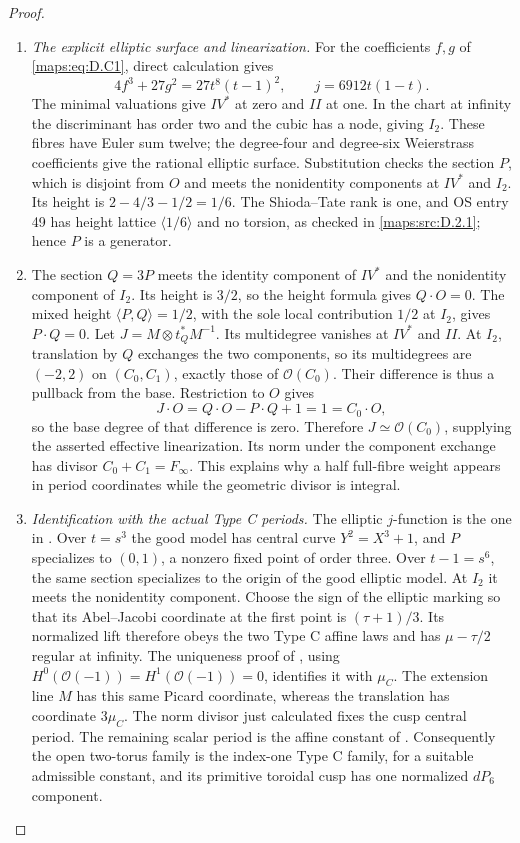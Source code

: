 \begin{proof}
\begin{enumerate}[label=\arabic*.,leftmargin=*]
\item \emph{The explicit elliptic surface and linearization.}
For the coefficients $f,g$ of \eqref{maps:eq:D.C1}, direct calculation gives
\[
 4f^3+27g^2=27t^8(t-1)^2,\qquad
 j=6912t(1-t).
\]
The minimal valuations give $IV^*$ at zero and $II$ at one.
In the chart at infinity the discriminant has order two and
the cubic has a node, giving $I_2$. These fibres have Euler
sum twelve; the degree-four and degree-six Weierstrass
coefficients give the rational elliptic surface. Substitution
checks the section $P$, which is disjoint from $O$ and meets
the nonidentity components at $IV^*$ and $I_2$.
Its height is $2-4/3-1/2=1/6$. The Shioda--Tate rank is one,
and OS entry 49 has height lattice $\langle1/6\rangle$ and
no torsion, as checked in \ref{maps:src:D.2.1}; hence $P$ is a generator.

\item The section $Q=3P$ meets the identity component of $IV^*$
and the nonidentity component of $I_2$. Its height is $3/2$,
so the height formula gives $Q\cdot O=0$.
The mixed height $\langle P,Q\rangle=1/2$, with the sole
local contribution $1/2$ at $I_2$, gives $P\cdot Q=0$.
Let $J=M\otimes t_Q^*M^{-1}$. Its multidegree vanishes at
$IV^*$ and $II$. At $I_2$, translation by $Q$ exchanges the
two components, so its multidegrees are $(-2,2)$ on
$(C_0,C_1)$, exactly those of $\mathcal O(C_0)$.
Their difference is thus a pullback from the base. Restriction
to $O$ gives
\[
 J\cdot O=Q\cdot O-P\cdot Q+1=1=C_0\cdot O,
\]
so the base degree of that difference is zero. Therefore
$J\simeq\mathcal O(C_0)$, supplying the asserted effective
linearization. Its norm under the component exchange has divisor
$C_0+C_1=F_\infty$. This explains why a half full-fibre weight
appears in period coordinates while the geometric divisor is
integral.

\item \emph{Identification with the actual Type C periods.}
The elliptic $j$-function is the one in
\cite[Proposition 3.1]{manYang26}. Over $t=s^3$ the good
model has central curve $Y^2=X^3+1$, and $P$ specializes to
$(0,1)$, a nonzero fixed point of order three.
Over $t-1=s^6$, the same section specializes to the origin
of the good elliptic model. At $I_2$ it meets the nonidentity
component. Choose the sign of the elliptic marking so that its
Abel--Jacobi coordinate at the first point is $(\tau+1)/3$.
Its normalized lift therefore obeys the two Type C affine
laws and has $\mu-\tau/2$ regular at infinity.
The uniqueness proof of \cite[Proposition 3.4]{manYang26},
using $H^0(\mathcal O(-1))=H^1(\mathcal O(-1))=0$, identifies
it with $\mu_C$.
The extension line $M$ has this same Picard coordinate,
whereas the translation has coordinate $3\mu_C$.
The norm divisor just calculated fixes the cusp central
period. The remaining scalar period is the affine constant
of \cite[Proposition 3.6]{manYang26}. Consequently the open
two-torus family is the index-one Type C family, for a suitable
admissible constant, and its primitive toroidal cusp has one
normalized $dP_6$ component.


\end{enumerate}
\end{proof}
